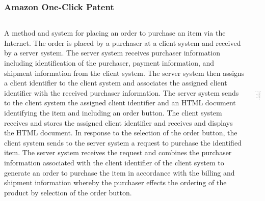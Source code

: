 \documentclass{beamer}
\begin{document}
\begin{frame}[t]\frametitle{Amazon One-Click Patent}
\vspace{-4mm}	
  \begin{columns}[T]
    \begin{column}{.5\textwidth}
    \begin{block}{}
    \tiny A method and system for placing an order to purchase an item via the Internet. The order is placed by a purchaser at a client system and received by a server system. The server system receives purchaser information including identification of the purchaser, payment information, and shipment information from the client system. The server system then assigns a client identifier to the client system and associates the assigned client identifier with the received purchaser information. The server system sends to the client system the assigned client identifier and an HTML document identifying the item and including an order button. The client system receives and stores the assigned client identifier and receives and displays the HTML document. In response to the selection of the order button, the client system sends to the server system a request to purchase the identified item. The server system receives the request and combines the purchaser information associated with the client identifier of the client system to generate an order to purchase the item in accordance with the billing and shipment information whereby the purchaser effects the ordering of the product by selection of the order button.
    \end{block}
    \end{column}
    \begin{column}{.5\textwidth}
      \includegraphics[height=2.75in,angle=0]{Amazon.png}
    \end{column}
    \end{columns}
\end{frame}
\end{document}
